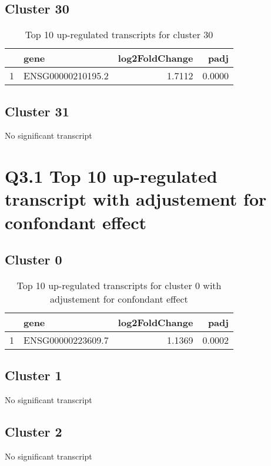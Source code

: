 \documentclass{article}
\begin{document}
\subsection{Cluster 30 }
\begin{table}[H]
\centering
\begin{tabularx}{\textwidth}{rlrr}
  \hline
 & gene & log2FoldChange & padj \\ 
  \hline
1 & ENSG00000210195.2 & 1.7112 & 0.0000 \\ 
   \hline
\end{tabularx}
\caption{Top 10 up-regulated transcripts for cluster 30} 
\label{tab:q3_1_30}
\end{table}
\subsection{Cluster 31 }
No significant transcript
\section{Q3.1 Top 10 up-regulated transcript with adjustement for confondant effect}
\subsection{Cluster 0 }
\begin{table}[H]
\centering
\begin{tabularx}{\textwidth}{rlrr}
  \hline
 & gene & log2FoldChange & padj \\ 
  \hline
1 & ENSG00000223609.7 & 1.1369 & 0.0002 \\ 
   \hline
\end{tabularx}
\caption{Top 10 up-regulated transcripts for cluster 0 with adjustement for confondant effect} 
\label{tab:q3_1_conf_0}
\end{table}
\subsection{Cluster 1 }
No significant transcript
\subsection{Cluster 2 }
No significant transcript
\end{document}
